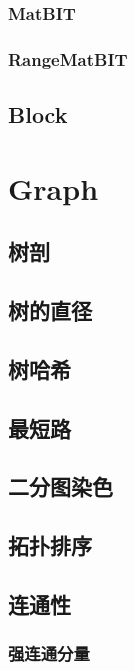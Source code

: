 \documentclass[10pt,a4paper]{article}
\begin{document}
\subsubsection{MatBIT}

\subsubsection{RangeMatBIT}

\subsection{Block}

\section{Graph}
\subsection{树剖}

\subsection{树的直径}

\subsection{树哈希}

\subsection{最短路}

\subsection{二分图染色}

\subsection{拓扑排序}

\subsection{连通性}
\subsubsection{强连通分量}

\end{document}

